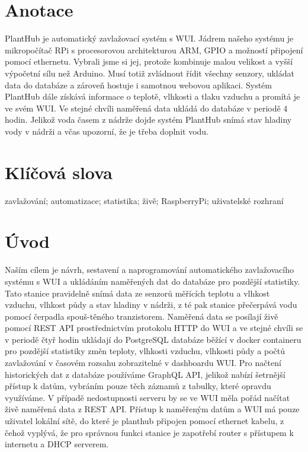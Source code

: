 \documentclass[12pt,a4paper]{article}
\begin{document}
\clearpage

\section*{Anotace}

PlantHub je automatický zavlažovací systém s WUI.
Jádrem našeho systému je mikropočítač RPi s procesorovou architekturou ARM,
GPIO a možností připojení pomocí ethernetu.
Vybrali jsme si jej, protože kombinuje malou velikost a vyšší výpočetní sílu
než Arduino. Musí totiž zvládnout řídit všechny senzory, ukládat data do
databáze a zároveň hostuje i samotnou webovou aplikaci. Systém PlantHub dále
získává informace o teplotě, vlhkosti a tlaku vzduchu a promítá je ve svém
WUI. Ve stejné chvíli naměřená data ukládá do databáze v periodě 4
hodin. Jelikož voda časem z nádrže dojde systém PlantHub snímá stav hladiny
vody v nádrži a včas upozorní, že je třeba doplnit vodu.

\section*{Klíčová slova}

zavlažování; automatizace; statistika; živě; RaspberryPi; uživatelské rozhraní

\clearpage

\tableofcontents

\clearpage

\section{Úvod}

Naším cílem je návrh, sestavení a naprogramování automatického zavlažovacího
systému s WUI a ukládáním naměřených dat do databáze
pro pozdější statistiky. Tato stanice pravidelně snímá data ze senzorů měřících
teplotu a vlhkost vzduchu, vlhkost půdy a stav hladiny v nádrži, z té pak
stanice přečerpává vodu pomocí čerpadla spouš-těného tranzistorem. Naměřená data
se posílají živě pomocí REST API prostřednictvím
protokolu HTTP do WUI a ve stejné
chvíli se v periodě čtyř hodin ukládají do PostgreSQL databáze běžící v docker
containeru pro pozdější
statistiky
změn teploty, vlhkosti vzduchu, vlhkosti půdy a počtů zavlažování v časovém
rozsahu zobrazitelné v dashboardu WUI. Pro načtení historických dat z databáze
používáme GraphQL API, jelikož nabízí šetrnější přístup k datům, vybráním pouze
těch záznamů z tabulky, které opravdu využíváme. V případě nedostupnosti
serveru by se ve WUI měla pořád načítat živě naměřená data z REST API. Přístup
k naměřeným datům a
WUI má pouze
uživatel lokální
sítě, do které je planthub připojen pomocí ethernet kabelu, z čehož vyplývá, že
pro správnou funkci
stanice je zapotřebí router s přístupem k internetu a DHCP serverem.
\end{document}
